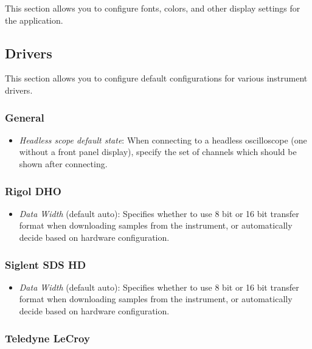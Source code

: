 This section allows you to configure fonts, colors, and other display settings for the application.


\subsection{Drivers}

This section allows you to configure default configurations for various instrument drivers.

\subsubsection{General}

\begin{itemize}
\item \emph{Headless scope default state}: When connecting to a headless oscilloscope (one without a front panel
display), specify the set of channels which should be shown after connecting.
\end{itemize}

\subsubsection{Rigol DHO}

\begin{itemize}
\item \emph{Data Width} (default auto): Specifies whether to use 8 bit or 16 bit transfer format when downloading samples
from the instrument, or automatically decide based on hardware configuration.
\end{itemize}

\subsubsection{Siglent SDS HD}

\begin{itemize}
\item \emph{Data Width} (default auto): Specifies whether to use 8 bit or 16 bit transfer format when downloading samples
from the instrument, or automatically decide based on hardware configuration.
\end{itemize}

\subsubsection{Teledyne LeCroy}

